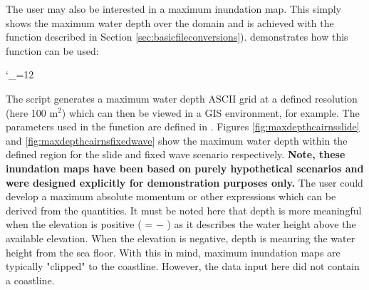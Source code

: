 \documentclass{manual}
\newcommand{\verbatiminputB}[1]{%
\endgroup}
\def\verbatiminputunderscore{\begingroup 
\catcode`\_=12
\verbatiminputB}
\begin{document}
The user may also be interested in a maximum inundation map. This simply shows the
maximum water depth over the domain and is achieved with the function 
described in Section \ref{sec:basicfileconversions}).
 demonstrates how this function can be used:

\verbatiminputunderscore{../../anuga_core/examples/cairns/ExportResults.py}

The script generates a maximum water depth ASCII grid at a defined
resolution (here 100 m$^2$) which can then be viewed in a GIS environment, for
example. The parameters used in the function are defined in .
Figures \ref{fig:maxdepthcairnsslide} and \ref{fig:maxdepthcairnsfixedwave} show
the maximum water depth within the defined region for the slide and fixed wave scenario
respectively. {\bf Note, these inundation maps have been based on purely hypothetical
scenarios and were designed explicitly for demonstration purposes only.}
The user could develop a maximum absolute momentum or other expressions which can be
derived from the quantities.
It must be noted here that depth is more meaningful when the elevation is positive
( =  $-$ ) as it describes the water height
above the available elevation. When the elevation is negative, depth is meauring the
water height from the sea floor. With this in mind, maximum inundation maps are
typically "clipped" to the coastline. However, the data input here did not contain a
coastline.

\clearpage
\end{document}
